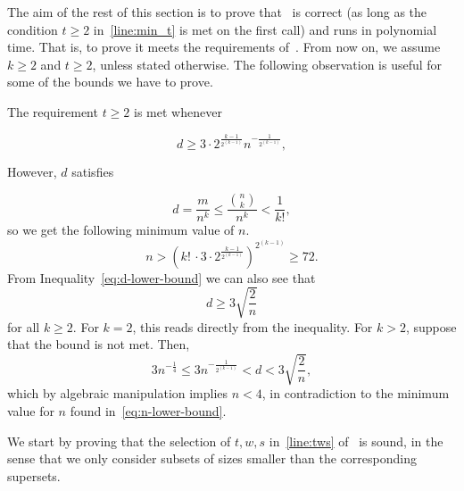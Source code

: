 The aim of the rest of this section is to prove that~ is correct
(as long as the  condition $t \geq 2$ in~\cref{line:min_t} is met on the first call)
and runs in polynomial time.
That is, to prove it meets the requirements of~.
From now on, we assume $k \geq 2$ and
$t \geq 2$, unless stated otherwise.
The following observation is useful for some of the bounds we have to prove.

\begin{remark}\label{rm:min_d}
    The requirement $t \geq 2$ is met whenever

    \begin{equation} \label{eq:d-lower-bound}
        d \geq 3 \cdot 2^{\frac{k - 1}{2^{(k-1)}}} n^{-\frac{1}{2^{(k-1)}}},
    \end{equation}

    However, $d$ satisfies

    \begin{equation} \label{eq:d-upper-bound}
        d = \frac{m}{n^k} \leq \frac{\binom{n}{k}}{n^k} < \frac{1}{k!},
    \end{equation}
    so we get the following minimum value of $n$.
    \begin{equation} \label{eq:n-lower-bound}
        n > \left( k!\, \cdot 3 \cdot 2^{\frac{k-1}{2^{(k-1)}}} \right)^{2^{(k-1)}} \geq 72.
    \end{equation}
    From Inequality~\eqref{eq:d-lower-bound} we can also see that
    \begin{equation} \label{eq:d-lower-bound-2}
        d \geq 3 \sqrt{\frac{2}{n}}
    \end{equation}
    for all $k \geq 2$.
    For $k=2$, this reads directly from the inequality.
    For $k > 2$, suppose that the bound is not met.
    Then,
    \[
        3 n^{-\frac{1}{4}} \leq 3 n^{-\frac{1}{2^{(k-1)}}} < d < 3 \sqrt{\frac{2}{n}},
    \]
    which by algebraic manipulation implies $n < 4$,
    in contradiction to the minimum value for $n$ found in~\eqref{eq:n-lower-bound}.
\end{remark}

We start by proving that the selection of $t, w, s$ in~\cref{line:tws} of~
is sound, in the sense that we only consider subsets of sizes smaller than the corresponding supersets.

